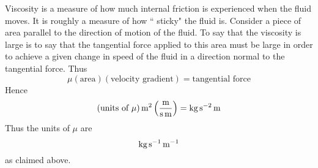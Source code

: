 Viscosity is a measure of how much internal friction is experienced
when the fluid moves. It is roughly a measure of how \textquotedblleft
sticky" the fluid is. Consider a piece of area parallel to the
direction of motion of the fluid. To say that the viscosity is large
is to say that the tangential force applied to this area must be large
in order to achieve a given change in speed of the fluid in a
direction normal to the tangential force. Thus
\begin{equation*}
  \mu (\text{area}) (\text{velocity gradient}) =\text{
    tangential force}
\end{equation*}
Hence
\begin{equation*}
  (\mbox{\rm units of $\mu$}) \mathop{\textrm{\rm m}}\nolimits^2\left(\frac{\mathop{\textrm{\rm m}}\nolimits}{\mathop{\textrm{\rm s}}\nolimits \mathop{\textrm{\rm m}}\nolimits}\right)
  = \mathop{\textrm{\rm kg}}\nolimits\mathop{\textrm{\rm s}}\nolimits^{-2}\mathop{\textrm{\rm m}}\nolimits
\end{equation*}
Thus the units of $\mu$ are
\begin{equation*}
  \mathop{\textrm{\rm kg}}\nolimits\mathop{\textrm{\rm s}}\nolimits^{-1}\mathop{\textrm{\rm m}}\nolimits^{-1}
\end{equation*}
as claimed above.

